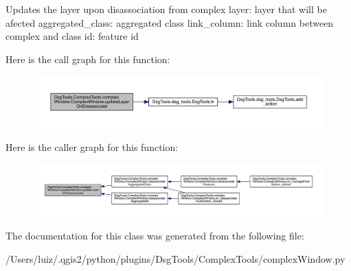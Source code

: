 \begin{DoxyVerb}Updates the layer upon disassociation from complex
layer: layer that will be afected
aggregated_class: aggregated class
link_column: link column between complex and class
id: feature id
\end{DoxyVerb}
 Here is the call graph for this function\+:
\nopagebreak
\begin{figure}[H]
\begin{center}
\leavevmode
\includegraphics[width=350pt]{class_dsg_tools_1_1_complex_tools_1_1complex_window_1_1_complex_window_a20403af8761555d878ff79ee16a398eb_cgraph}
\end{center}
\end{figure}
Here is the caller graph for this function\+:
\nopagebreak
\begin{figure}[H]
\begin{center}
\leavevmode
\includegraphics[width=350pt]{class_dsg_tools_1_1_complex_tools_1_1complex_window_1_1_complex_window_a20403af8761555d878ff79ee16a398eb_icgraph}
\end{center}
\end{figure}


The documentation for this class was generated from the following file\+:\begin{DoxyCompactItemize}
\item 
/\+Users/luiz/.\+qgis2/python/plugins/\+Dsg\+Tools/\+Complex\+Tools/complex\+Window.\+py\end{DoxyCompactItemize}
